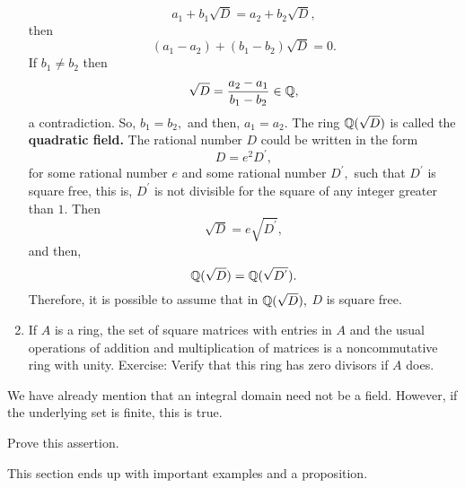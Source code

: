 \documentclass[11pt,a4paper]{article}
\begin{document}
\begin{exa}
\begin{enumerate}[label=(\roman*)]
\[a_1+b_1\sqrt{D}=a_2+b_2\sqrt{D},\]
then 
\[(a_1-a_2)+(b_1-b_2)\sqrt{D}=0.\]
If $b_1\neq b_2$ then \[\sqrt{D}=\frac{a_2-a_1}{b_1-b_2}\in\mathbb{Q},\]
 a contradiction. So, $b_1=b_2,$ and then, $a_1=a_2. $ The ring $\mathbb{Q}(\sqrt{D})$ is called the \textbf{quadratic field.}
 The rational number $D$ could be written in the form \[D=e^2D^{'},\] for some rational number $e$ and some rational number $D^{'},$ such that $D^{'}$ is square free, this is, $D^{'}$ is not divisible for the square of any integer greater than $1$. Then 
\[\sqrt{D}=e\sqrt{D^{'}},\]
and then, \[\mathbb{Q}(\sqrt{D})=\mathbb{Q}(\sqrt{D^{'}}).\]
Therefore, it is possible to assume that in $\mathbb{Q}(\sqrt{D}),$ $D$ is square free. 


\item If \(A\) is a ring, the set of square matrices with entries in \(A\) and the usual operations of addition and multiplication of matrices is a noncommutative ring with unity. Exercise: Verify that this ring has zero divisors if \(A\) does.
\end{enumerate}

\end{exa}
   

We have already mention that an integral domain need not be a field. However, if the underlying set is finite, this is true.

\begin{eje}
    Prove this assertion.
\end{eje}

This section ends up with important examples and a proposition. 
\end{document}
